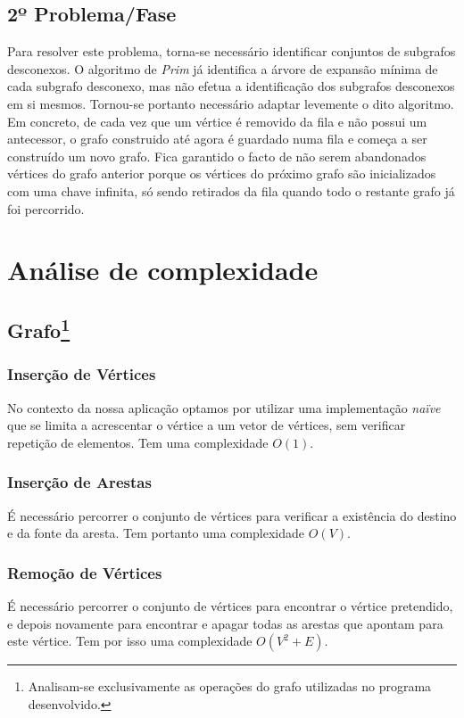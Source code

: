 \documentclass[a4paper,12pt,titlepage]{article}
\begin{document}
\subsection{2º Problema/Fase}
Para resolver este problema, torna-se necessário identificar conjuntos de subgrafos desconexos. O algoritmo de \emph{Prim} já identifica a árvore de expansão mínima de cada subgrafo desconexo, mas não efetua a identificação dos subgrafos desconexos em si mesmos. Tornou-se portanto necessário adaptar levemente o dito algoritmo. Em concreto, de cada vez que um vértice é removido da fila e não possui um antecessor, o grafo construido até agora é guardado numa fila e começa a ser construído um novo grafo. Fica garantido o facto de não serem abandonados vértices do grafo anterior porque os vértices do próximo grafo são inicializados com uma chave infinita, só sendo retirados da fila quando todo o restante grafo já foi percorrido.

\section{Análise de complexidade}
\subsection[Grafo]{Grafo\footnote{Analisam-se exclusivamente as operações do grafo utilizadas no programa desenvolvido.}}

\subsubsection{Inserção de Vértices}
No contexto da nossa aplicação optamos por utilizar uma implementação \emph{naïve} que se limita a acrescentar o vértice a um vetor de vértices, sem verificar repetição de elementos. Tem uma complexidade $O(1)$.

\subsubsection{Inserção de Arestas}
É necessário percorrer o conjunto de vértices para verificar a existência do destino e da fonte da aresta. Tem portanto uma complexidade $O(V)$.

\subsubsection{Remoção de Vértices}
É necessário percorrer o conjunto de vértices para encontrar o vértice pretendido, e depois novamente para encontrar e apagar todas as arestas que apontam para este vértice. Tem por isso uma complexidade $O(V^2+E)$.
\end{document}
